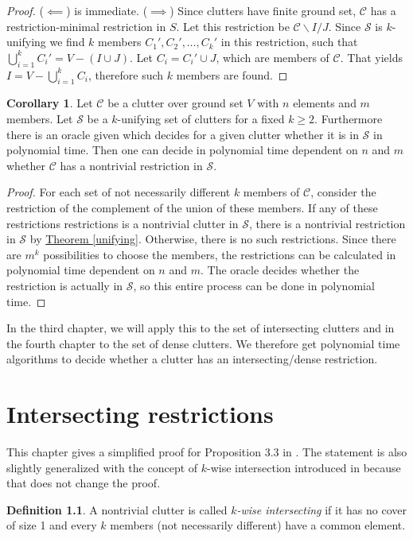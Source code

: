 \documentclass[a4paper, 12pt, twoside=false]{scrbook}
\theoremstyle{definition}
\newtheorem*{definition}{Definition}
\newtheorem{corollary}[theorem]{Corollary}
\begin{document}
   \begin{proof}
       ($\impliedby$) is immediate.
       ($\implies$) Since clutters have finite ground set, $\mathcal{C}$ has a restriction-minimal restriction in $S$.
       Let this restriction be $\mathcal{C}\backslash I / J$.
       Since $\mathcal{S}$ is $k$-unifying we find $k$ members $C_1', C_2', \ldots, C_k'$ in this restriction, such that $\bigcup_{i=1}^k C_i' = V - (I \cup J)$.
       Let $C_i = C_i' \cup J$, which are members of $\mathcal{C}$.
       That yields $I=V-\bigcup_{i=1}^k C_i$, therefore such $k$ members are found.
   \end{proof}
   \begin{corollary}
       Let $\mathcal{C}$ be a clutter over ground set $V$ with $n$ elements and $m$ members.
       Let $\mathcal{S}$ be a $k$-unifying set of clutters for a fixed $k\geq 2$.
       Furthermore there is an oracle given which decides for a given clutter whether it is in $\mathcal{S}$ in polynomial time.
       Then one can decide in polynomial time dependent on $n$ and $m$ whether $\mathcal{C}$ has a nontrivial restriction in $\mathcal{S}$.
   \end{corollary}

   \begin{proof}
       For each set of not necessarily different $k$ members of $\mathcal{C}$, consider the restriction of the complement of the union of these members.
       If any of these restrictions restrictions is a nontrivial clutter in $\mathcal{S}$, there is a nontrivial restriction in $\mathcal{S}$ by \hyperref[unifying]{Theorem \ref*{unifying}}.
       Otherwise, there is no such restrictions.
       Since there are $m^k$ possibilities to choose the members, the restrictions can be calculated in polynomial time dependent on $n$ and $m$. The oracle decides whether the restriction is actually in $\mathcal{S}$, so this entire process can be done in polynomial time.
   \end{proof}

   In the third chapter, we will apply this to the set of intersecting clutters and in the fourth chapter to the set of dense clutters.
   We therefore get polynomial time algorithms to decide whether a clutter has an intersecting/dense restriction.

   \chapter{Intersecting restrictions}
   This chapter gives a simplified proof for Proposition 3.3 in \cite{restrictions}.
   The statement is also slightly generalized with the concept of $k$-wise intersection introduced in \cite{k-wise} because that does not change the proof.
   \begin{definition}
       A nontrivial clutter is called \emph{$k$-wise intersecting} if it has no cover of size 1 and every $k$ members (not necessarily different) have a common element.
   \end{definition}
\end{document}
